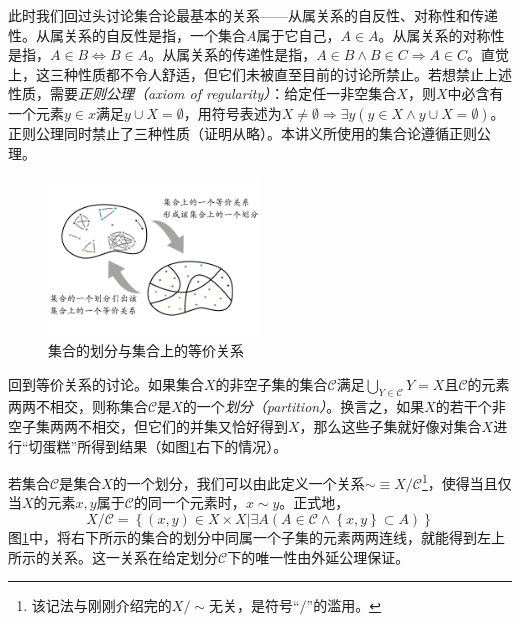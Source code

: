 \documentclass[../main.tex]{subfiles}
\begin{document}
此时我们回过头讨论集合论最基本的关系——从属关系的自反性、对称性和传递性。从属关系的自反性是指，一个集合$A$属于它自己，$A\in A$。从属关系的对称性是指，$A\in B\Leftrightarrow B\in A$。从属关系的传递性是指，$A\in B \wedge B\in C\Rightarrow A\in C$。直觉上，这三种性质都不令人舒适，但它们未被直至目前的讨论所禁止。若想禁止上述性质，需要\emph{正则公理（axiom of regularity）}：给定任一非空集合$X$，则$X$中必含有一个元素$y\in x$满足$y\cup X=\emptyset$，用符号表述为$X\neq \emptyset\Rightarrow\exists y\left(y\in X\wedge y\cup X=\emptyset\right)$。正则公理同时禁止了三种性质（证明从略）。本讲义所使用的集合论遵循正则公理。

\begin{figure}[htbp]
    \centering
    \includegraphics[width=0.5\textwidth]{../images/partition.pdf}
    \caption{集合的划分与集合上的等价关系}
    \label{fig:II.1.2}
\end{figure}

回到等价关系的讨论。如果集合$X$的非空子集的集合$\mathcal{C}$满足$\bigcup_{Y\in\mathcal{C}}Y=X$且$\mathcal{C}$的元素两两不相交，则称集合$\mathcal{C}$是$X$的一个\emph{划分（partition）}。换言之，如果$X$的若干个非空子集两两不相交，但它们的并集又恰好得到$X$，那么这些子集就好像对集合$X$进行“切蛋糕”所得到结果（如图\ref{fig:II.1.2}右下的情况）。

若集合$\mathcal{C}$是集合$X$的一个划分，我们可以由此定义一个关系$\sim\equiv X/\mathcal{C}$\footnote{该记法与刚刚介绍完的$X/\sim$无关，是符号“$/$”的滥用。}，使得当且仅当$X$的元素$x,y$属于$\mathcal{C}$的同一个元素时，$x\sim y$。正式地，
\begin{equation}\label{eq:relation_induced_by_partition}
    X/\mathcal{C}=\left\{\left(x,y\right)\in X\times X|\exists A\left(A\in \mathcal{C}\wedge\left\{x,y\right\}\subset A\right)\right\}
\end{equation}
图\ref{fig:II.1.2}中，将右下所示的集合的划分中同属一个子集的元素两两连线，就能得到左上所示的关系。这一关系在给定划分$\mathcal{C}$下的唯一性由外延公理保证。
\end{document}
